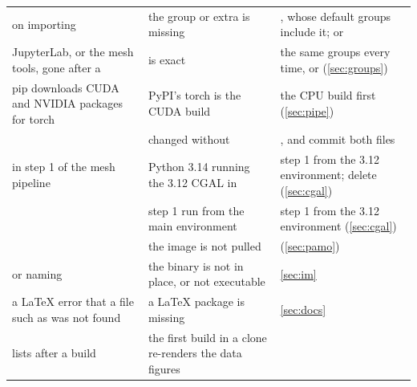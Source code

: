\begin{longtable}{@{}L{48mm}L{50mm}L{53mm}@{}}
 on importing  & the  group or extra is missing & , whose default groups include it; or  \\
JupyterLab, or the mesh tools, gone after a  &  is exact & the same groups every time, or  (\cref{sec:groups}) \\
pip downloads CUDA and NVIDIA packages for torch & PyPI's torch is the CUDA build & the CPU build first (\cref{sec:pipe}) \\
 &  changed without  & , and commit both files \\
 in step 1 of the mesh pipeline & Python 3.14 running the 3.12 CGAL in  & step 1 from the 3.12 environment; delete  (\cref{sec:cgal}) \\
 & step 1 run from the main environment & step 1 from the 3.12 environment (\cref{sec:cgal}) \\
 & the image is not pulled &  (\cref{sec:pamo}) \\
 or  naming  & the binary is not in place, or not executable & \cref{sec:im} \\
a LaTeX error that a file such as  was not found & a LaTeX package is missing & \cref{sec:docs} \\
 lists  after a build & the first build in a clone re-renders the data figures &  \\
\bottomrule
\end{longtable}


